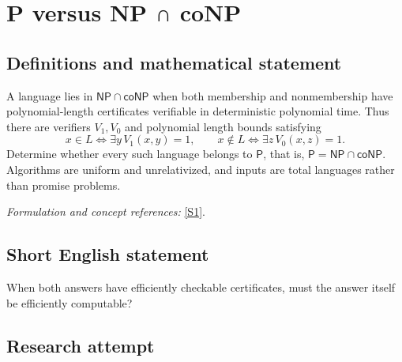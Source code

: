 \documentclass[11pt,a4paper]{article}
\newcommand{\sref}[2]{\hyperlink{source:#1:#2}{[S#2]}}
\newif\ifshowcatalogue
\newcommand{\cataloguescope}[1]{\ifshowcatalogue
 \paragraph{Exact scope in the supplied catalogue.}
 \begin{quote}\small #1\end{quote}\fi}
\numberwithin{equation}{section}
\begin{document}
\setcounter{section}{0}
\clearpage
\section*{\texorpdfstring{P versus NP ∩ coNP}{P versus NP ∩ coNP}}\label{30006687}
\subsection{Definitions and mathematical statement}
A language lies in $\mathsf{NP}\cap\mathsf{coNP}$ when both membership and nonmembership have polynomial-length certificates verifiable in deterministic polynomial time. Thus there are verifiers $V_1,V_0$ and polynomial length bounds satisfying
\[
 x\in L\iff\exists y\,V_1(x,y)=1,\qquad
 x\notin L\iff\exists z\,V_0(x,z)=1.
\]
Determine whether every such language belongs to $\mathsf P$, that is, $\mathsf P=\mathsf{NP}\cap\mathsf{coNP}$. Algorithms are uniform and unrelativized, and inputs are total languages rather than promise problems.
\par\smallskip\textit{Formulation and concept references:} \sref{30006687}{1}.
\cataloguescope{Determine whether P = NP \ensuremath{\cap} coNP for ordinary uniform deterministic and nondeterministic polynomial-time Turing-machine classes of total languages over a finite alphabet; equivalently, whether every language with polynomially checkable certificates for both membership and nonmembership has a deterministic polynomial-time decision algorithm.}
\subsection{Short English statement}
When both answers have efficiently checkable certificates, must the answer itself be efficiently computable?
\subsection{Research attempt}
\end{document}

